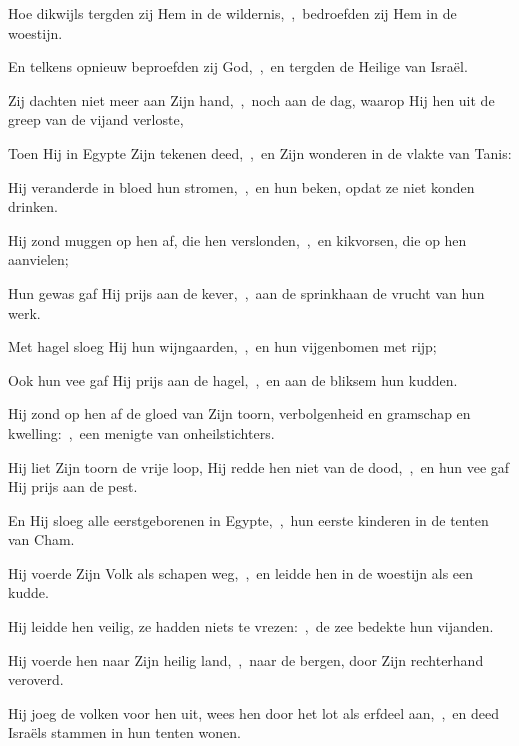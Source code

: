 \documentclass[12pt,twoside,a5paper]{article}
\begin{document}
\begin{halfparskip}
  Hoe dikwijls tergden zij Hem in de wildernis,~\sep\ bedroefden zij Hem in de woestijn.

  En telkens opnieuw beproefden zij God,~\sep\ en tergden de Heilige van Israël.

  Zij dachten niet meer aan Zijn hand,~\sep\ noch aan de dag, waarop Hij hen uit de greep van de vijand verloste,

  Toen Hij in Egypte Zijn tekenen deed,~\sep\ en Zijn wonderen in de vlakte van Tanis:

  Hij veranderde in bloed hun stromen,~\sep\ en hun beken, opdat ze niet konden drinken.

  Hij zond muggen op hen af, die hen verslonden,~\sep\ en kikvorsen, die op hen aanvielen;

  Hun gewas gaf Hij prijs aan de kever,~\sep\ aan de sprinkhaan de vrucht van hun werk.

  Met hagel sloeg Hij hun wijngaarden,~\sep\ en hun vijgenbomen met rijp;

  Ook hun vee gaf Hij prijs aan de hagel,~\sep\ en aan de bliksem hun kudden.

  Hij zond op hen af de gloed van Zijn toorn, verbolgenheid en gramschap en kwelling:~\sep\ een menigte van onheilstichters.

  Hij liet Zijn toorn de vrije loop, Hij redde hen niet van de dood,~\sep\ en hun vee gaf Hij prijs aan de pest.

  En Hij sloeg alle eerstgeborenen in Egypte,~\sep\ hun eerste kinderen in de tenten van Cham.

  Hij voerde Zijn Volk als schapen weg,~\sep\ en leidde hen in de woestijn als een kudde.

  Hij leidde hen veilig, ze hadden niets te vrezen:~\sep\ de zee bedekte hun vijanden.

  Hij voerde hen naar Zijn heilig land,~\sep\ naar de bergen, door Zijn rechterhand veroverd.

  Hij joeg de volken voor hen uit, wees hen door het lot als erfdeel aan,~\sep\ en deed Israëls stammen in hun tenten wonen.
\end{halfparskip}

\end{document}
